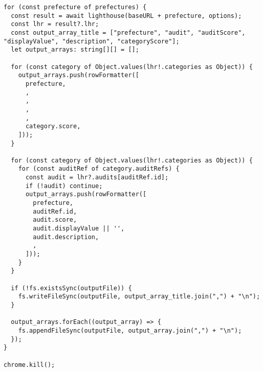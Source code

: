 \begin{lstlisting}[caption={Lighthouseを用いたパフォーマンスの測定},label={lst:Lighthouseを用いたパフォーマンスの測定}]
for (const prefecture of prefectures) {
  const result = await lighthouse(baseURL + prefecture, options);
  const lhr = result?.lhr;
  const output_array_title = ["prefecture", "audit", "auditScore", "displayValue", "description", "categoryScore"];
  let output_arrays: string[][] = [];

  for (const category of Object.values(lhr!.categories as Object)) {
    output_arrays.push(rowFormatter([
      prefecture,
      ,
      ,
      ,
      ,
      category.score,
    ]));
  }

  for (const category of Object.values(lhr!.categories as Object)) {
    for (const auditRef of category.auditRefs) {
      const audit = lhr?.audits[auditRef.id];
      if (!audit) continue;
      output_arrays.push(rowFormatter([
        prefecture,
        auditRef.id,
        audit.score,
        audit.displayValue || '',
        audit.description,
        ,
      ]));
    }
  }

  if (!fs.existsSync(outputFile)) {
    fs.writeFileSync(outputFile, output_array_title.join(",") + "\n");
  }

  output_arrays.forEach((output_array) => {
    fs.appendFileSync(outputFile, output_array.join(",") + "\n");
  });
}

chrome.kill();
\end{lstlisting}

